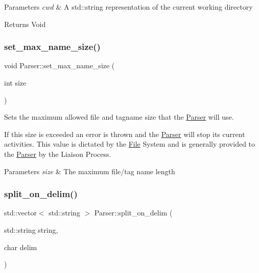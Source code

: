 \begin{DoxyParams}{Parameters}
{\em cwd} & A std\+::string representation of the current working directory\\
\hline
\end{DoxyParams}
\begin{DoxyReturn}{Returns}
Void 
\end{DoxyReturn}
\mbox{\label{classParser_ac9c3bf43a7f27f92ecf538b83c5984d6}} 
\subsubsection{\texorpdfstring{set\+\_\+max\+\_\+name\+\_\+size()}{set\_max\_name\_size()}}
{\footnotesize\ttfamily void Parser\+::set\+\_\+max\+\_\+name\+\_\+size (\begin{DoxyParamCaption}\item[{int}]{size }\end{DoxyParamCaption})}



Sets the maximum allowed file and tagname size that the \mbox{\hyperlink{classParser}{Parser}} will use. 

If this size is exceeded an error is thrown and the \mbox{\hyperlink{classParser}{Parser}} will stop its current activities. This value is dictated by the \mbox{\hyperlink{classFile}{File}} System and is generally provided to the \mbox{\hyperlink{classParser}{Parser}} by the Liaison Process.


\begin{DoxyParams}{Parameters}
{\em size} & The maximum file/tag name length \\
\hline
\end{DoxyParams}
\mbox{\label{classParser_a71c87961db9707dc18db00a645d3d1e5}} 
\subsubsection{\texorpdfstring{split\+\_\+on\+\_\+delim()}{split\_on\_delim()}}
{\footnotesize\ttfamily std\+::vector$<$ std\+::string $>$ Parser\+::split\+\_\+on\+\_\+delim (\begin{DoxyParamCaption}\item[{std\+::string}]{string,  }\item[{char}]{delim }\end{DoxyParamCaption})\hspace{0.3cm}{\ttfamily [static]}}



